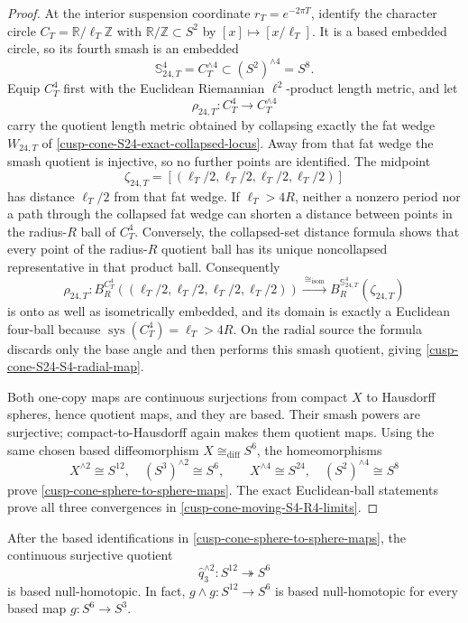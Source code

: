 \begin{proof}
At the interior suspension coordinate \(r_T=e^{-2\pi T}\), identify the
character circle \(C_T=\mathbb R/\ell_T\mathbb Z\) with
\(\mathbb R/\mathbb Z\subset S^2\) by \([x]\mapsto[x/\ell_T]\).  It is a
based embedded circle, so its fourth smash is an embedded
\[
 \mathbb S_{24,T}^4=C_T^{\wedge4}\subset(S^2)^{\wedge4}=S^8.
\]
Equip \(C_T^4\) first with the Euclidean Riemannian \(\ell^2\)-product
length metric, and let
\[
 \rho_{24,T}:C_T^4\longrightarrow C_T^{\wedge4}
\]
carry the quotient length metric obtained by collapsing exactly the fat
wedge \(W_{24,T}\) of
\cref{cusp-cone-S24-exact-collapsed-locus}.  Away from that fat wedge the
smash quotient is injective, so no further points are identified.  The
midpoint
\[
 \zeta_{24,T}
 =[(\ell_T/2,\ell_T/2,\ell_T/2,\ell_T/2)]
\]
has distance \(\ell_T/2\) from that fat wedge.  If \(\ell_T>4R\), neither a
nonzero period nor a path through the collapsed fat wedge can shorten a
distance between points in the radius-\(R\) ball of \(C_T^4\).  Conversely,
the collapsed-set distance formula shows that every point of the
radius-\(R\) quotient ball has its unique noncollapsed representative in
that product ball.  Consequently
\begin{equation}
 \rho_{24,T}:
 B_R^{C_T^4}((\ell_T/2,\ell_T/2,\ell_T/2,\ell_T/2))
 \xrightarrow{\ \cong_{\mathrm{isom}}\ }
 B_R^{\mathbb S_{24,T}^4}(\zeta_{24,T})
 \label{cusp-cone-S24-onto-exact-ball}
\end{equation}
is onto as well as isometrically embedded, and its domain is exactly a
Euclidean four-ball because \(\operatorname{sys}(C_T^4)=\ell_T>4R\).  On
the radial source the formula discards only the base angle and then performs
this smash quotient, giving
\cref{cusp-cone-S24-S4-radial-map}.

Both one-copy maps are continuous surjections from compact \(X\) to
Hausdorff spheres, hence quotient maps, and they are based.  Their smash
powers are surjective; compact-to-Hausdorff again makes them quotient maps.
Using the same chosen based diffeomorphism \(X\cong_{\mathrm{diff}}S^6\),
the homeomorphisms
\[
 X^{\wedge2}\cong S^{12},\quad(S^3)^{\wedge2}\cong S^6,
 \qquad
 X^{\wedge4}\cong S^{24},\quad(S^2)^{\wedge4}\cong S^8
\]
prove \cref{cusp-cone-sphere-to-sphere-maps}.  The exact Euclidean-ball
statements prove all three convergences in
\cref{cusp-cone-moving-S4-R4-limits}.
\end{proof}

\begin{corollary}
\label{cusp-cone-S12-sphere-map-null}
After the based identifications in
\cref{cusp-cone-sphere-to-sphere-maps}, the continuous surjective quotient
\[
 \widehat q_3^{\wedge2}:S^{12}\twoheadrightarrow S^6
\]
is based null-homotopic.  In fact, \(g\wedge g:S^{12}\to S^6\) is based
null-homotopic for every based map \(g:S^6\to S^3\).
\end{corollary}

